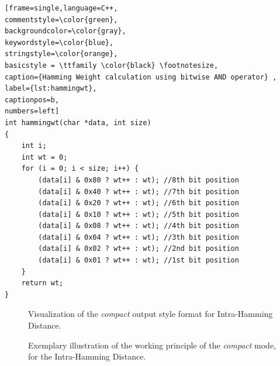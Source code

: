 \begin{center}
\begin{minipage}{0.7\textwidth}
\begin{lstlisting}[frame=single,language=C++,
commentstyle=\color{green},
backgroundcolor=\color{gray},
keywordstyle=\color{blue},
stringstyle=\color{orange},
basicstyle = \ttfamily \color{black} \footnotesize,
caption={Hamming Weight calculation using bitwise AND operator} ,
label={lst:hammingwt},
captionpos=b,
numbers=left]
int hammingwt(char *data, int size)
{
    int i;
    int wt = 0;
    for (i = 0; i < size; i++) {
        (data[i] & 0x80 ? wt++ : wt); //8th bit position
        (data[i] & 0x40 ? wt++ : wt); //7th bit position
        (data[i] & 0x20 ? wt++ : wt); //6th bit position
        (data[i] & 0x10 ? wt++ : wt); //5th bit position
        (data[i] & 0x08 ? wt++ : wt); //4th bit position
        (data[i] & 0x04 ? wt++ : wt); //3th bit position
        (data[i] & 0x02 ? wt++ : wt); //2nd bit position
        (data[i] & 0x01 ? wt++ : wt); //1st bit position
    }
    return wt;
}
\end{lstlisting}
\end{minipage}
\end{center}

\begin{figure}
\centering
{}
\caption{Visualization of the \emph{compact} output style format for Intra-Hamming Distance.}
\label{img:4_intra_compact}
\end{figure}

\begin{figure}
\centering
{}
\caption{Exemplary illustration of the working principle of the \emph{compact} mode, for the Intra-Hamming Distance.}
\label{img:4_intra_WP}
\end{figure}

